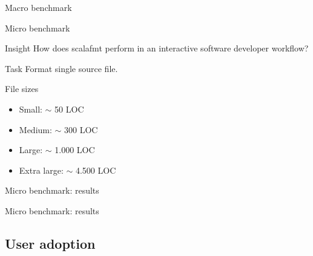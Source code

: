 \documentclass[xcolor=dvipsnames]{beamer}
\theoremstyle{definition}
\begin{document}
\begin{frame}{Macro benchmark}
  \begin{table}[H]
    \centering
    
  \end{table}
\end{frame}

\begin{frame}{Micro benchmark}
  \begin{block}{Insight}
     How does scalafmt perform in an interactive software developer workflow?
  \end{block}
  \begin{block}{Task}
    Format single source file.
  \end{block}
\end{frame}

\begin{frame}{File sizes}
  \begin{table}[H]
    \centering
    \caption{Lines of code per source file. Collected from sample of $\sim$27.000 source files with total 3.2 million lines of code.}\label{tab:micro}
    
  \end{table}
  \begin{itemize}
    \item Small: $\sim$ 50 LOC
    \item Medium: $\sim$ 300 LOC
    \item Large: $\sim$ 1.000 LOC
    \item Extra large: $\sim$ 4.500 LOC
  \end{itemize}
\end{frame}

\begin{frame}{Micro benchmark: results}
  \begin{table}[H]
    \centering
    
  \end{table}
\end{frame}

\begin{frame}{Micro benchmark: results}
  \begin{table}[H]
    \centering
    
  \end{table}
\end{frame}


\subsection{User adoption}
\end{document}

